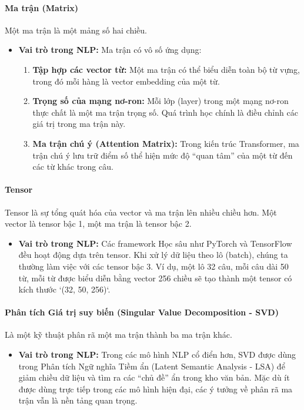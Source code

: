 \paragraph{Ma trận (Matrix)}
Một ma trận là một mảng số hai chiều.
\begin{itemize}
    \item \textbf{Vai trò trong NLP:} Ma trận có vô số ứng dụng:
        \begin{enumerate}
            \item \textbf{Tập hợp các vector từ:} Một ma trận có thể biểu diễn toàn bộ từ vựng, trong đó mỗi hàng là vector embedding của một từ.
            \item \textbf{Trọng số của mạng nơ-ron:} Mỗi lớp (layer) trong một mạng nơ-ron thực chất là một ma trận trọng số. Quá trình học chính là điều chỉnh các giá trị trong ma trận này.
            \item \textbf{Ma trận chú ý (Attention Matrix):} Trong kiến trúc Transformer, ma trận chú ý lưu trữ điểm số thể hiện mức độ “quan tâm” của một từ đến các từ khác trong câu.
        \end{enumerate}
\end{itemize}

\paragraph{Tensor}
Tensor là sự tổng quát hóa của vector và ma trận lên nhiều chiều hơn. Một vector là tensor bậc 1, một ma trận là tensor bậc 2.
\begin{itemize}
    \item \textbf{Vai trò trong NLP:} Các framework Học sâu như PyTorch và TensorFlow đều hoạt động dựa trên tensor. Khi xử lý dữ liệu theo lô (batch), chúng ta thường làm việc với các tensor bậc 3. Ví dụ, một lô 32 câu, mỗi câu dài 50 từ, mỗi từ được biểu diễn bằng vector 256 chiều sẽ tạo thành một tensor có kích thước `(32, 50, 256)`.
\end{itemize}

\paragraph{Phân tích Giá trị suy biến (Singular Value Decomposition - SVD)}
Là một kỹ thuật phân rã một ma trận thành ba ma trận khác.
\begin{itemize}
    \item \textbf{Vai trò trong NLP:} Trong các mô hình NLP cổ điển hơn, SVD được dùng trong Phân tích Ngữ nghĩa Tiềm ẩn (Latent Semantic Analysis - LSA) để giảm chiều dữ liệu và tìm ra các “chủ đề” ẩn trong kho văn bản. Mặc dù ít được dùng trực tiếp trong các mô hình hiện đại, các ý tưởng về phân rã ma trận vẫn là nền tảng quan trọng.
\end{itemize}

